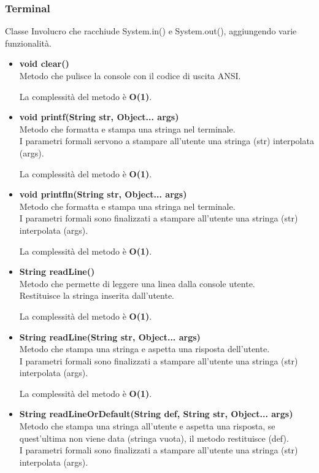 \documentclass[a4paper, 12pt]{scrreprt}
\begin{document}
				\subsubsection{Terminal}
				Classe Involucro che racchiude System.in() e System.out(), aggiungendo varie funzionalit\`a.
				\begin{itemize}
					\item \textbf{void clear()}
					\\Metodo che pulisce la console con il codice di uscita ANSI.
					
					La complessit\`a del metodo è \textbf{O(1)}.
					
					\item \textbf{void printf(String str, Object... args)}
					\\Metodo che formatta e stampa una stringa nel terminale.
					\\I parametri formali servono a stampare all'utente una stringa (str) interpolata (args).
					
					La complessit\`a del metodo è \textbf{O(1)}.
					
					\item \textbf{void printfln(String str, Object... args)}
					\\Metodo che formatta e stampa una stringa nel terminale.
					\\I parametri formali sono finalizzati a stampare all'utente una stringa (str) interpolata (args).
					
					La complessit\`a del metodo è \textbf{O(1)}.
					
					\item \textbf{String readLine()}
					\\Metodo che permette di leggere una linea dalla console utente.
					\\Restituisce la stringa inserita dall'utente.
					
					La complessit\`a del metodo è \textbf{O(1)}.
					
					\item \textbf{String readLine(String str, Object... args)}
					\\Metodo che stampa una stringa e aspetta una risposta dell'utente.
					\\I parametri formali sono finalizzati a stampare all'utente una stringa (str) interpolata (args).
					
					La complessit\`a del metodo è \textbf{O(1)}.
					
					\item \textbf{String readLineOrDefault(String def, String str, Object... args)}
					\\Metodo che stampa una stringa all'utente e aspetta una risposta, se quest'ultima non viene data (stringa vuota), il metodo restituisce (def).
					\\I parametri formali sono finalizzati a stampare all'utente una stringa (str) interpolata (args).
					

\end{itemize}
\end{document}
